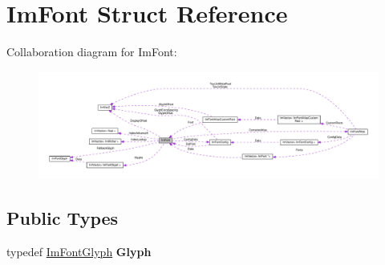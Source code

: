 \hypertarget{structImFont}{}\section{Im\+Font Struct Reference}
\label{structImFont}


Collaboration diagram for Im\+Font\+:\nopagebreak
\begin{figure}[H]
\begin{center}
\leavevmode
\includegraphics[width=350pt]{structImFont__coll__graph}
\end{center}
\end{figure}
\subsection*{Public Types}
\begin{DoxyCompactItemize}
\item 
\mbox{\label{structImFont_a4b802233ac8d3f3beddc395837288683}} 
typedef \hyperlink{structImFontGlyph}{Im\+Font\+Glyph} {\bfseries Glyph}
\end{DoxyCompactItemize}
